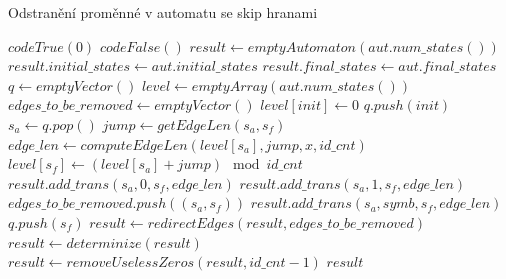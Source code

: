\begin{algorithm}
    \caption{Odstranění proměnné v automatu se skip hranami}
    \label{project}
        \begin{algorithmic}[1]
                    \State \Return $codeTrue(0)$
                \EndIf
                    \State \Return $codeFalse()$
                \EndIf
                \State $result \gets emptyAutomaton(aut.num\_states())$
                \State $result.initial\_states \gets aut.initial\_states$
                \State $result.final\_states \gets aut.final\_states$
                \State $q \gets emptyVector()$
                \State $level \gets emptyArray(aut.num\_states())$
                \State $edges\_to\_be\_removed \gets emptyVector()$
                    \State $level[init] \gets 0$
                    \State $q.push(init)$
                \EndFor
                    \State $s_a \gets q.pop()$
                        \State $jump \gets getEdgeLen(s_a,s_f)$
                        \State $edge\_len \gets computeEdgeLen(level[s_a], jump, x, id\_cnt)$
                        \State $level[s_f] \gets (level[s_a]+jump) \mod id\_cnt$
                            \State $result.add\_trans(s_a, 0, s_f, edge\_len)$
                            \State $result.add\_trans(s_a, 1, s_f, edge\_len)$
                            \State $edges\_to\_be\_removed.push((s_a,s_f))$
                        \Else
                            \State $result.add\_trans(s_a, symb, s_f, edge\_len)$
                        \EndIf
                            \State $q.push(s_f)$
                        \EndIf
                    \EndFor
                \EndWhile
                \State $result \gets redirectEdges(result,edges\_to\_be\_removed)$
                \State $result \gets determinize(result)$
                \State $result \gets removeUselessZeros(result, id\_cnt - 1)$
                \State \Return $result$
            \EndProcedure
        \end{algorithmic}
\end{algorithm}

